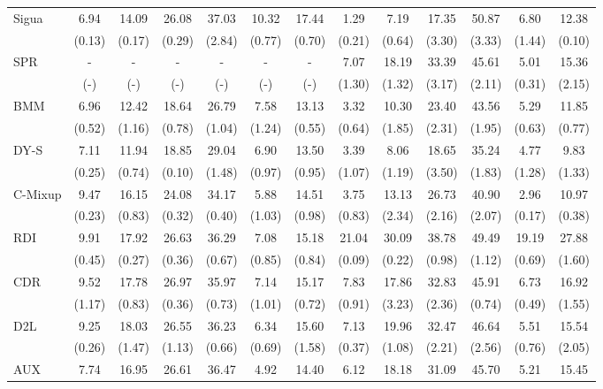 \documentclass{article}
\theoremstyle{plain}
\theoremstyle{definition}
\theoremstyle{remark}
\begin{document}
\begin{table}[t]
\begin{center}
\begin{small}
{\begin{tabular}{lcccccccccccc}
        \multirow{2}{*}{Sigua} & 6.94 & 14.09 & 26.08 & 37.03 & 10.32 & 17.44 & 1.29 & 7.19 & 17.35 & 50.87 & 6.80 & 12.38 \\
            & (0.13) & (0.17) & (0.29) & (2.84) & (0.77) & (0.70) &	(0.21) & (0.64) & (3.30) & (3.33) & (1.44) & (0.10) \\
        \multirow{2}{*}{SPR} &-&-&-&-&-&-& 7.07 & 18.19 & 33.39 & 45.61 & 5.01 & 15.36 \\
           & (-) & (-) & (-) & (-) & (-) & (-) & (1.30) & (1.32) & (3.17) & (2.11) & (0.31) & (2.15) \\
        \multirow{2}{*}{BMM} & 6.96 & 12.42 & 18.64 & 26.79 & 7.58 & 13.13 & 3.32 & 10.30 & 23.40 & 43.56 & 5.29 & 11.85 \\
            & (0.52) & (1.16) & (0.78) & (1.04) & (1.24) & (0.55) &	(0.64) & (1.85) & (2.31) & (1.95) & (0.63) & (0.77) \\
        \multirow{2}{*}{DY-S} & 7.11 & 11.94 & 18.85 & 29.04 & 6.90 & 13.50 & 3.39 & 8.06 & 18.65 & 35.24 & 4.77 & 9.83 \\
            & (0.25) & (0.74) & (0.10) & (1.48) & (0.97) & (0.95) &	(1.07) & (1.19) & (3.50) & (1.83) & (1.28) & (1.33) \\
        \multirow{2}{*}{C-Mixup} & 9.47 & 16.15 & 24.08 & 34.17 & 5.88 & 14.51 & 3.75 & 13.13 & 26.73 & 40.90 & 2.96 & 10.97 \\
            & (0.23) & (0.83) & (0.32) & (0.40) & (1.03) & (0.98) &	(0.83) & (2.34) & (2.16) & (2.07) & (0.17) & (0.38) \\
        \multirow{2}{*}{RDI} & 9.91 & 17.92 & 26.63 & 36.29 & 7.08 & 15.18 & 21.04 & 30.09 & 38.78 & 49.49 & 19.19 & 27.88 \\
            & (0.45) & (0.27) & (0.36) & (0.67) & (0.85) & (0.84) &	(0.09) & (0.22) & (0.98) & (1.12) & (0.69) & (1.60) \\
        \multirow{2}{*}{CDR} & 9.52 & 17.78 & 26.97 & 35.97 & 7.14 & 15.17 & 7.83 & 17.86 & 32.83 & 45.91 & 6.73 & 16.92 \\
            & (1.17) & (0.83) & (0.36) & (0.73) & (1.01) & (0.72) &	(0.91) & (3.23) & (2.36) & (0.74) & (0.49) & (1.55) \\
        \multirow{2}{*}{D2L} & 9.25 & 18.03 & 26.55 & 36.23 & 6.34 & 15.60 & 7.13 & 19.96 & 32.47 & 46.64 & 5.51 & 15.54 \\
            & (0.26) & (1.47) & (1.13) & (0.66) & (0.69) & (1.58) &	(0.37) & (1.08) & (2.21) & (2.56) & (0.76) & (2.05) \\
        \multirow{2}{*}{AUX} & 7.74 & 16.95 & 26.61 & 36.47 & 4.92 & 14.40 & 6.12 & 18.18 & 31.09 & 45.70 & 5.21 & 15.45 \\

\end{tabular}}
\end{small}
\end{center}
\end{table}
\end{document}
